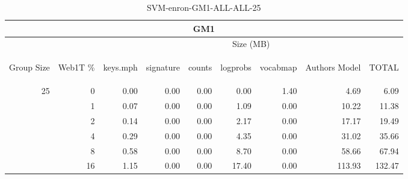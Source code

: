 \begin{center}
\begin{table}[htbp] 
 \begin{center}
\begin{tabular}{ | r | r | r | r | r | r | r | r | r |}
\hline
\multicolumn{9}{|c|}{GM1}\\
\hline
 & & \multicolumn{7}{|c|}{Size (MB)}\\ \cline{3-9}
\begin{sideways}Group Size\end{sideways} & \begin{sideways}Web1T \% \end{sideways} & \begin{sideways}keys.mph\end{sideways} & \begin{sideways}signature\end{sideways} & \begin{sideways}counts\end{sideways} & \begin{sideways}logprobs\end{sideways} & \begin{sideways}vocabmap\end{sideways} & \begin{sideways}Authors Model \end{sideways} & \begin{sideways}TOTAL\end{sideways}\\
\hline
\multirow{5}{*}{25}
 & 0 & 0.00 & 0.00 & 0.00 & 0.00 & 1.40 & 4.69 & 6.09\\ \cline{2-9}
 & 1 & 0.07 & 0.00 & 0.00 & 1.09 & 0.00 & 10.22 & 11.38\\ \cline{2-9}
 & 2 & 0.14 & 0.00 & 0.00 & 2.17 & 0.00 & 17.17 & 19.49\\ \cline{2-9}
 & 4 & 0.29 & 0.00 & 0.00 & 4.35 & 0.00 & 31.02 & 35.66\\ \cline{2-9}
 & 8 & 0.58 & 0.00 & 0.00 & 8.70 & 0.00 & 58.66 & 67.94\\ \cline{2-9}
 & 16 & 1.15 & 0.00 & 0.00 & 17.40 & 0.00 & 113.93 & 132.47\\ \cline{2-9}
\hline
\end{tabular}
\caption{SVM-enron-GM1-ALL-ALL-25}
\label{table:SVM-enron-GM1-ALL-ALL-25}
\end{center}
 \end{table}
\end{center}

